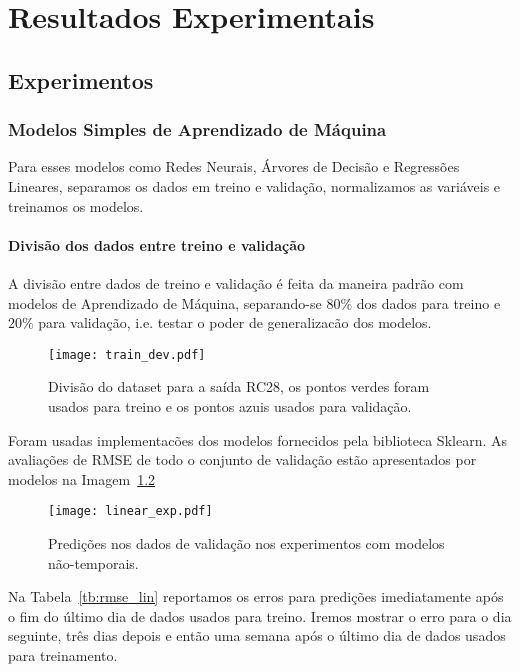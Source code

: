 \chapter{ Resultados Experimentais }
\label{cap:resultados}
\section{Experimentos}




\subsection{Modelos Simples de Aprendizado de Máquina}

Para esses modelos como Redes Neurais, Árvores de Decisão e Regressões
Lineares, separamos os dados em treino e validação, normalizamos as variáveis e
treinamos os modelos. 

\subsubsection{Divisão dos dados entre treino e validação}


A divisão entre dados de treino e validação é feita da maneira padrão com
modelos de Aprendizado de Máquina, separando-se $80\%$ dos dados para treino e
$20\%$ para validação, i.e. testar o poder de generalizacão dos modelos. 

\begin{figure}[H]
  \centering
  \texttt{[image: train\_dev.pdf]}
  \caption{Divisão do dataset para a saída RC28, os pontos verdes foram usados para
    treino e os pontos azuis usados para validação.}
  \label{fig:divrc28}
\end{figure}

Foram usadas implementacões dos modelos fornecidos pela biblioteca Sklearn.
As avaliações de RMSE de todo o conjunto de validação estão apresentados por modelos na Imagem~\ref{fig:linmodels}  

\begin{figure}[H]
  \centering
\texttt{[image: linear\_exp.pdf]}
\caption{Predições nos dados de validação nos experimentos com modelos não-temporais. }
\label{fig:linmodels}
\end{figure}

Na Tabela~\ref{tb:rmse_lin} reportamos os erros para predições imediatamente
após o fim do último dia de dados usados para treino. Iremos mostrar o
erro para o dia seguinte, três dias depois e então uma semana após o último dia
de dados usados para treinamento.

